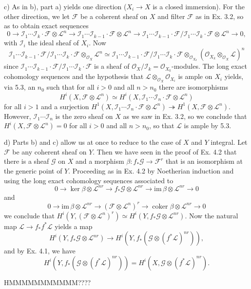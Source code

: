 \documentclass{report}
\renewcommand{\L}{\mathscr{L}}
\renewcommand{\Im}{\mathrm{im\,}}
\newcommand{\I}{\mathscr{I}}
\newcommand{\F}{\mathcal{F}}
\renewcommand{\O}{\mathcal{O}}
\newcommand{\G}{\mathcal{G}}
\DeclareMathOperator{\coker}{coker}
\begin{document}
\noindent
c)	As in b), part a) yields one direction ($X_i\rightarrow X$ is a closed immersion).  For the other direction,
we let $\F$ be a coherent sheaf on $X$ and filter $\F$ as in Ex. 3.2, so as to obtain exact sequences
$$0\rightarrow \I_1\cdots\I_k\cdot\F\otimes \L^n \rightarrow \I_1\cdots\I_{k-1}\cdot \F\otimes \L^n \rightarrow \I_1\cdots\I_{k-1}\cdot\F/\I_1\cdots\I_{k}\cdot\F\otimes\L^n\rightarrow 0,$$
with $\I_i$ the ideal sheaf of $X_i$.
Now
 $$\I_1\cdots\I_{k-1}\cdot\F/\I_1\cdots\I_{k}\cdot\F\otimes_{\O_X}\L^n\simeq \I_1\cdots\I_{k-1}\cdot\F/\I_1\cdots\I_{k}\cdot\F\otimes_{\O_{X_k}}
 (\O_{X_k}\otimes_{\O_X} \L)^n$$ 
since $\I_1\cdots\I_{k-1}\cdot\F/\I_1\cdots\I_{k}\cdot\F$ is a sheaf of $\O_X/\I_k=\O_{X_k}$-modules.
  The long exact cohomology sequences and the hypothesis that $\L\otimes_{\O_{X}}\O_{X_i}$ is ample on $X_i$
yields, via 5.3, an $n_0$ such that for all $i>0$ and all $n>n_0$ there are isomorphisms
$$H^i(X,\F\otimes\L^n)\simeq H^i(X,\I_1\cdots\I_n\cdot\F \otimes \L^n)$$
for all $i>1$ and a surjection $H^1(X,\I_1\cdots\I_n\cdot\F\otimes\L^n)\twoheadrightarrow H^1(X,\F\otimes\L^n)$.
However, $\I_1\cdots\I_n$ is the zero sheaf on $X$ as we saw in Ex. 3.2, so we conclude that $H^i(X,\F\otimes\L^n)=0$
for all $i>0$ and all $n>n_0$, so that $\L$ is ample by 5.3.

\noindent
d)	Parts b) and c) allow us at once to reduce to the case of $X$ and $Y$ integral.   Let $\F$
be any coherent sheaf on $Y$.  Then we have seen in the proof of Ex. 4.2 that there is 
a sheaf $\G$ on $X$ and a morphism 
$\beta:f_*\G\rightarrow \F^r$ that is an isomorphism at the generic point of $Y$.  Proceeding as in Ex. 4.2
by Noetherian induction and using the long exact cohomology sequences associated to
$$0\rightarrow \ker\beta\otimes \L^{nr}\rightarrow f_*\G\otimes \L^{nr}\rightarrow \Im \beta\otimes\L^{nr}\rightarrow 0$$
and
$$0\rightarrow \Im\beta\otimes \L^{nr}\rightarrow (\F\otimes \L^{n})^{r}\rightarrow \coker \beta\otimes\L^{nr}\rightarrow 0$$
we conclude that $H^i(Y,(\F\otimes\L^n)^r)\simeq H^i(Y,f_*\G\otimes\L^{nr})$.
Now the natural map $\L\rightarrow f_*f^*\L$ yields a map $$H^i(Y,f_*\G\otimes\L^{nr})\rightarrow H^i(Y,f_*(\G\otimes (f^*\L)^{nr})),$$
and by Ex. 4.1, we have
 $$H^i(Y,f_*(\G\otimes (f^*\L)^{nr}))=H^i(X,\G\otimes (f^*\L)^{nr}).$$


HMMMMMMMMMMM????
\end{document}

